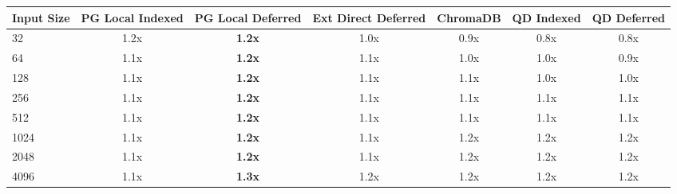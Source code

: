 \begin{tabular}{lcccccc}
\toprule
\textbf{Input Size} & \textbf{PG Local Indexed} & \textbf{PG Local Deferred} & \textbf{Ext Direct Deferred} & \textbf{ChromaDB} & \textbf{QD Indexed} & \textbf{QD Deferred} \\
\midrule
32 & 1.2x & \textbf{1.2x} & 1.0x & 0.9x & 0.8x & 0.8x \\
64 & 1.1x & \textbf{1.2x} & 1.1x & 1.0x & 1.0x & 0.9x \\
128 & 1.1x & \textbf{1.2x} & 1.1x & 1.1x & 1.0x & 1.0x \\
256 & 1.1x & \textbf{1.2x} & 1.1x & 1.1x & 1.1x & 1.1x \\
512 & 1.1x & \textbf{1.2x} & 1.1x & 1.1x & 1.1x & 1.1x \\
1024 & 1.1x & \textbf{1.2x} & 1.1x & 1.2x & 1.2x & 1.2x \\
2048 & 1.1x & \textbf{1.2x} & 1.1x & 1.2x & 1.2x & 1.2x \\
4096 & 1.1x & \textbf{1.3x} & 1.2x & 1.2x & 1.2x & 1.2x \\
\bottomrule
\end{tabular}
